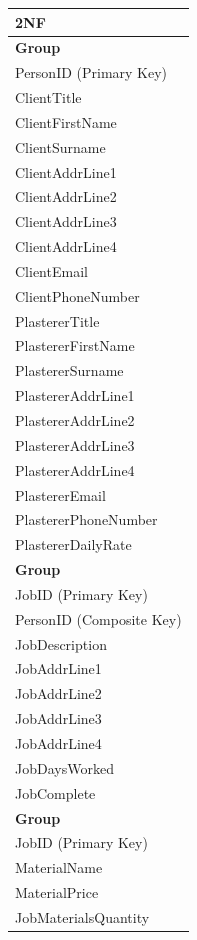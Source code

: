 \begin{flushleft}
    \begin{longtable}{|p{12cm}|}
        \hline
			 \textbf{2NF} \\ \hline
         \textbf{Group} \\ \hline
			PersonID (Primary Key) \\ 
         ClientTitle \\
			ClientFirstName \\
			ClientSurname \\
			ClientAddrLine1 \\
			ClientAddrLine2 \\
			ClientAddrLine3 \\
			ClientAddrLine4 \\
			ClientEmail \\
			ClientPhoneNumber \\
			PlastererTitle \\
			PlastererFirstName \\
			PlastererSurname \\
			PlastererAddrLine1 \\
			PlastererAddrLine2 \\
			PlastererAddrLine3 \\
			PlastererAddrLine4 \\
			PlastererEmail \\
			PlastererPhoneNumber \\
			PlastererDailyRate \\ \hline

			\textbf{Group} \\ \hline
			JobID (Primary Key) \\
			PersonID (Composite Key) \\
         JobDescription \\
			JobAddrLine1 \\
			JobAddrLine2 \\
			JobAddrLine3 \\
			JobAddrLine4 \\
			JobDaysWorked \\
			JobComplete \\ \hline
		
			\textbf{Group} \\ \hline
			JobID (Primary Key) \\ 
			MaterialName \\
			MaterialPrice \\
			JobMaterialsQuantity \\


\end{longtable}
\end{flushleft}
